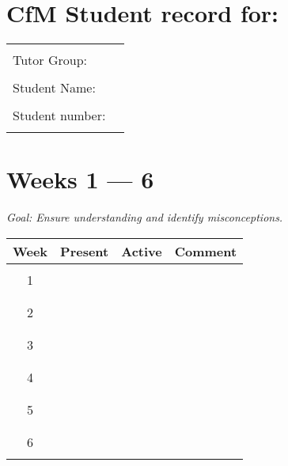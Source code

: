 \documentclass[12pt]{article}
\begin{document}
\section*{CfM Student record for:}

\begin{center}
	\begin{tabular}{lp{}}
		                & \\
		Tutor Group:    & \\
		                & \\
		Student Name:           & \\
		                & \\
		Student number: & \\
		                & \\
	\end{tabular}
\end{center}

\section*{Weeks 1 --- 6}
\centering\small{\textit{Goal: Ensure understanding and identify misconceptions.}}

\begin{center}
	\begin{tabular}{c|l|l|p{}}
		\toprule
		Week        & Present & Active & Comment\\
		\midrule
		            &         &        & \\
		1           &         &        & \\
		            &         &        & \\
		\midrule
		            &         &        & \\
		2           &         &        & \\
		            &         &        & \\
		\midrule
		            &         &        & \\
		3           &         &        & \\
		            &         &        & \\
		\midrule
		            &         &        & \\
		4           &         &        & \\
		            &         &        & \\
		\midrule
		            &         &        & \\
		5           &         &        & \\
		            &         &        & \\
		\midrule
		            &         &        & \\
		6           &         &        & \\
		            &         &        & \\
		\bottomrule
	\end{tabular}
\end{center}
\end{document}
